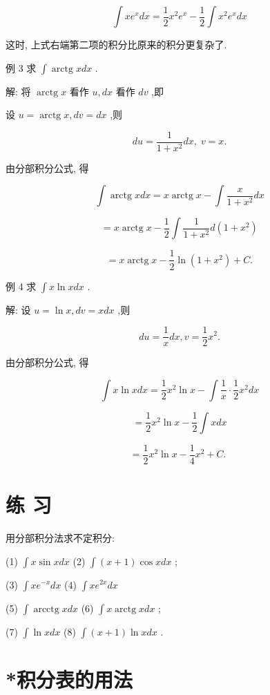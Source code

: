 \documentclass[10pt]{article}
\begin{document}
\[
\int x{e}^{x}{dx} = \frac{1}{2}{x}^{2}{e}^{x} - \frac{1}{2}\int {x}^{2}{e}^{x}{dx}
\]

这时, 上式右端第二项的积分比原来的积分更复杂了.

例 3 求 \(\int \operatorname{arctg}{xdx}\) .

解: 将 \(\operatorname{arctg}x\) 看作 \(u,{dx}\) 看作 \({dv}\) ,即

设 \(u = \operatorname{arctg}x,{dv} = {dx}\) ,则

\[
{du} = \frac{1}{1 + {x}^{2}}{dx},\;v = x.
\]

由分部积分公式, 得

\[
\int \operatorname{arctg}{xdx} = x\operatorname{arctg}x - \int \frac{x}{1 + {x}^{2}}{dx}
\]

\[
= x\operatorname{arctg}x - \frac{1}{2}\int \frac{1}{1 + {x}^{2}}d\left( {1 + {x}^{2}}\right)
\]

\[
= x\operatorname{arctg}x - \frac{1}{2}\ln \left( {1 + {x}^{2}}\right) + C\text{.}
\]

例 4 求 \(\int x\ln {xdx}\) .

解: 设 \(u = \ln x,{dv} = {xdx}\) ,则

\[
{du} = \frac{1}{x}{dx},v = \frac{1}{2}{x}^{2}.
\]

由分部积分公式, 得

\[
\int x\ln {xdx} = \frac{1}{2}{x}^{2}\ln x - \int \frac{1}{x} \cdot \frac{1}{2}{x}^{2}{dx}
\]

\[
= \frac{1}{2}{x}^{2}\ln x - \frac{1}{2}\int {xdx}
\]

\[
= \frac{1}{2}{x}^{2}\ln x - \frac{1}{4}{x}^{2} + C\text{. }
\]

\section*{练 习}

用分部积分法求不定积分:

(1) \(\int x\sin {xdx}\) (2) \(\int \left( {x + 1}\right) \cos {xdx}\) ;

(3) \(\int x{e}^{-x}{dx}\) (4) \(\int x{e}^{2x}{dx}\)

(5) \(\int \operatorname{arcctg}{xdx}\) (6) \(\int x\operatorname{arctg}{xdx}\) ;

(7) \(\int \ln {xdx}\) (8) \(\int \left( {x + 1}\right) \ln {xdx}\) .

\section*{*积分表的用法}
\end{document}
